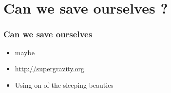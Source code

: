 \documentclass[10pt,handout]{beamer}
\begin{document}
\section{Can we save ourselves ?}

\begin{frame}
    \frametitle{Can we save ourselves}
    \begin{center}
      \begin{itemize}
        \item<1-> maybe
        \item<2-> \url{http://supergravity.org}
        \item<2-> Using on of the sleeping beauties
    \end{itemize}
    \end{center}
\end{frame}
\end{document}
